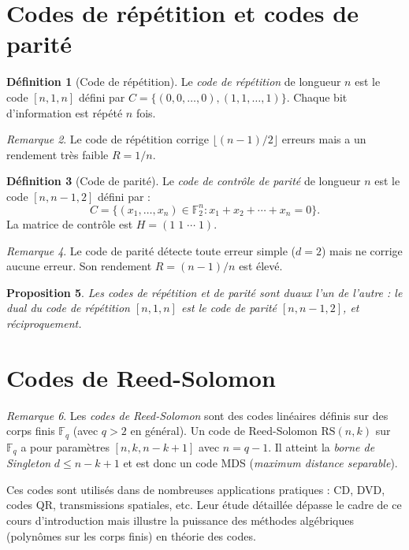 \documentclass[12pt,a4paper,openany]{book}
\theoremstyle{definition}
\newtheorem{definition}{Définition}[chapter]
\theoremstyle{plain}
\newtheorem{proposition}[definition]{Proposition}
\theoremstyle{remark}
\newtheorem{remarque}[definition]{Remarque}
\begin{document}
\section{Codes de répétition et codes de parité}
\label{sec:repetition-parite}

\begin{definition}[Code de répétition]
\label{def:code-repetition}
Le \emph{code de répétition} de longueur $n$ est le code $[n, 1, n]$
défini par $C = \{(0,0,\dots,0), (1,1,\dots,1)\}$. Chaque bit
d'information est répété $n$ fois.
\end{definition}

\begin{remarque}
Le code de répétition corrige $\lfloor (n-1)/2 \rfloor$ erreurs mais
a un rendement très faible $R = 1/n$.
\end{remarque}

\begin{definition}[Code de parité]
\label{def:code-parite}
Le \emph{code de contrôle de parité} de longueur $n$ est le code
$[n, n-1, 2]$ défini par :
\[
  C = \{(x_1, \dots, x_n) \in \mathbb{F}_2^n : x_1 + x_2 + \cdots +
  x_n = 0\}.
\]
La matrice de contrôle est $H = (1\; 1\; \cdots\; 1)$.
\end{definition}

\begin{remarque}
Le code de parité détecte toute erreur simple ($d=2$) mais ne corrige
aucune erreur. Son rendement $R = (n-1)/n$ est élevé.
\end{remarque}

\begin{proposition}
Les codes de répétition et de parité sont duaux l'un de l'autre :
le dual du code de répétition $[n,1,n]$ est le code de parité $[n,n-1,2]$,
et réciproquement.
\end{proposition}

\section{Codes de Reed-Solomon}
\label{sec:reed-solomon}

\begin{remarque}
Les \emph{codes de Reed-Solomon} sont des codes linéaires définis sur des
corps finis $\mathbb{F}_q$ (avec $q > 2$ en général). Un code de
Reed-Solomon $\mathrm{RS}(n, k)$ sur $\mathbb{F}_q$ a pour paramètres
$[n, k, n-k+1]$ avec $n = q-1$. Il atteint la \emph{borne de Singleton}
$d \leq n - k + 1$ et est donc un code MDS (\emph{maximum distance
separable}).

Ces codes sont utilisés dans de nombreuses applications pratiques : CD,
DVD, codes QR, transmissions spatiales, etc. Leur étude détaillée dépasse
le cadre de ce cours d'introduction mais illustre la puissance des
méthodes algébriques (polynômes sur les corps finis) en théorie des codes.
\end{remarque}
\end{document}
